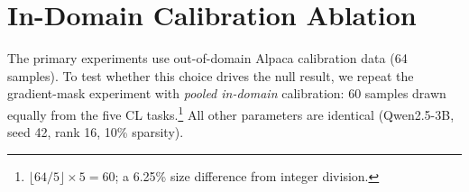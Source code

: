 




\section{In-Domain Calibration Ablation}
\label{app:calibration}

The primary experiments use out-of-domain Alpaca calibration data (64 samples). To test whether this choice drives the null result, we repeat the gradient-mask experiment with \emph{pooled in-domain} calibration: 60 samples drawn equally from the five CL tasks.\footnote{$\lfloor 64/5 \rfloor \times 5 = 60$; a 6.25\% size difference from integer division.} All other parameters are identical (Qwen2.5-3B, seed 42, rank 16, 10\% sparsity).

